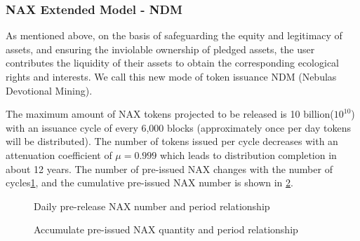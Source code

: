 \subsubsection{NAX Extended Model - NDM}
As mentioned above, on the basis of safeguarding the equity and legitimacy of assets, and ensuring the inviolable ownership of pledged assets, the user contributes the liquidity of their assets to obtain the corresponding ecological rights and interests. We call this new mode of token issuance NDM (Nebulas Devotional Mining). 

The maximum amount of NAX tokens projected to be released is 10 billion(\(10^{10}\)) with an issuance cycle of every 6,000 blocks (approximately once per day tokens will be distributed). The number of tokens issued per cycle decreases with an attenuation coefficient of $\mu=0.999$ which leads to distribution completion in about 12 years. The number of pre-issued NAX changes with the number of cycles\ref{dist}, and the cumulative pre-issued NAX number is shown in \ref{acc}.

\begin{figure}
\centering
    \caption{Daily pre-release NAX number and period relationship}\label{dist}
\end{figure}


\begin{figure}
\centering
\caption{Accumulate pre-issued NAX quantity and period relationship}\label{acc}
\end{figure}

